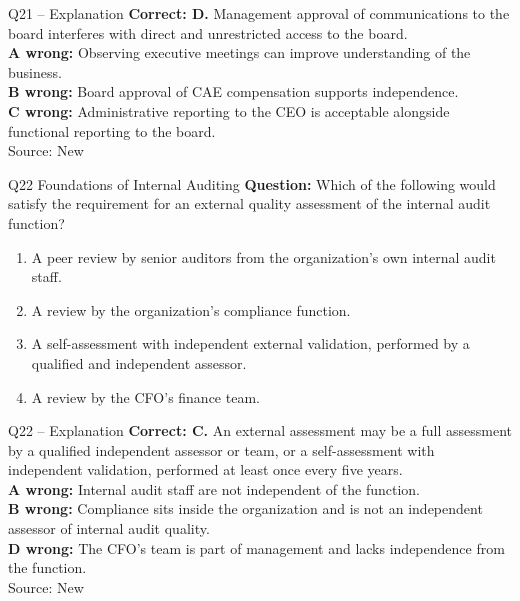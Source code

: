 \documentclass[aspectratio=169,10pt]{beamer}
\begin{document}
\begin{frame}[t]{Q21 -- Explanation}
	\footnotesize
	\textbf{Correct: D.} Management approval of communications to the board interferes with direct and unrestricted access to the board. \\[5pt]
\textbf{A wrong:} Observing executive meetings can improve understanding of the business. \\[3pt]
\textbf{B wrong:} Board approval of CAE compensation supports independence. \\[3pt]
\textbf{C wrong:} Administrative reporting to the CEO is acceptable alongside functional reporting to the board. \\[3pt]
	\vfill {\tiny Source: New}
\end{frame}

\begin{frame}[t]{Q22 \hfill {\scriptsize Foundations of Internal Auditing}}
	\small
	\textbf{Question:} Which of the following would satisfy the requirement for an external quality assessment of the internal audit function?
	\begin{enumerate}[label=\Alph*.,itemsep=1pt,topsep=3pt]
			\item A peer review by senior auditors from the organization's own internal audit staff.
			\item A review by the organization's compliance function.
			\item A self-assessment with independent external validation, performed by a qualified and independent assessor.
			\item A review by the CFO's finance team.
	\end{enumerate}
\end{frame}

\begin{frame}[t]{Q22 -- Explanation}
	\footnotesize
	\textbf{Correct: C.} An external assessment may be a full assessment by a qualified independent assessor or team, or a self-assessment with independent validation, performed at least once every five years. \\[5pt]
\textbf{A wrong:} Internal audit staff are not independent of the function. \\[3pt]
\textbf{B wrong:} Compliance sits inside the organization and is not an independent assessor of internal audit quality. \\[3pt]
\textbf{D wrong:} The CFO's team is part of management and lacks independence from the function. \\[3pt]
	\vfill {\tiny Source: New}
\end{frame}
\end{document}
